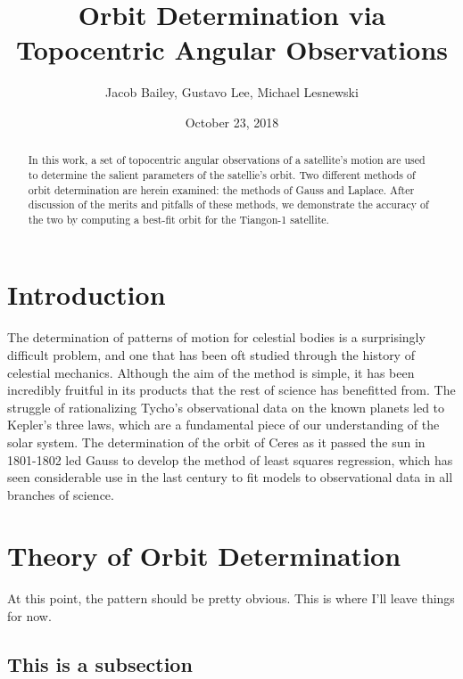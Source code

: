\documentclass[11pt,twoside,letterpaper]{article}
\begin{document}
\title{Orbit Determination via Topocentric Angular Observations}
\author{Jacob Bailey, Gustavo Lee, Michael Lesnewski}
\date{October 23, 2018}
\maketitle

  \begin{abstract}
    In this work, a set of topocentric angular observations of a
    satellite's motion are used to determine the salient parameters of
    the satellie's orbit. Two different methods of orbit determination
    are herein examined: the methods of Gauss and Laplace. After
    discussion of the merits and pitfalls of these methods, we
    demonstrate the accuracy of the two by computing a best-fit orbit
    for the Tiangon-1 satellite.
  \end{abstract}

  \section {Introduction}
  \paragraph{}
  The determination of patterns of motion for celestial bodies is a
  surprisingly difficult problem, and one that has been oft studied
  through the history of celestial mechanics. Although the aim of the
  method is simple, it has been incredibly fruitful in its products
  that the rest of science has benefitted from. The struggle of
  rationalizing Tycho's observational data on the known planets led to
  Kepler's three laws, which are a fundamental piece of our
  understanding of the solar system. The determination of the orbit of
  Ceres as it passed the sun in 1801-1802 led Gauss to develop the
  method of least squares regression, which has seen considerable use
  in the last century to fit models to observational data in all
  branches of science.
  
  \section{Theory of Orbit Determination}
  At this point, the pattern should be pretty obvious. This is where
  I'll leave things for now.

  \subsection {This is a subsection}
    
\end{document}

